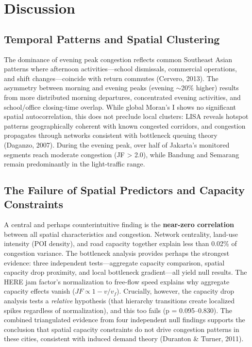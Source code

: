 \documentclass[12pt,a4paper]{article}
\begin{document}
\section{Discussion}

\subsection{Temporal Patterns and Spatial Clustering}

The dominance of evening peak congestion reflects common Southeast Asian patterns where afternoon activities---school dismissals, commercial operations, and shift changes---coincide with return commutes (Cervero, 2013). The asymmetry between morning and evening peaks (evening $\sim$20\% higher) results from more distributed morning departures, concentrated evening activities, and school/office closing-time overlap. While global Moran's I shows no significant spatial autocorrelation, this does not preclude local clusters: LISA reveals hotspot patterns geographically coherent with known congested corridors, and congestion propagates through networks consistent with bottleneck queuing theory (Daganzo, 2007). During the evening peak, over half of Jakarta's monitored segments reach moderate congestion (JF > 2.0), while Bandung and Semarang remain predominantly in the light-traffic range.

\subsection{The Failure of Spatial Predictors and Capacity Constraints}

A central and perhaps counterintuitive finding is the \textbf{near-zero correlation} between all spatial characteristics and congestion. Network centrality, land-use intensity (POI density), and road capacity together explain less than 0.02\% of congestion variance. The bottleneck analysis provides perhaps the strongest evidence: three independent tests---aggregate capacity comparison, spatial capacity drop proximity, and local bottleneck gradient---all yield null results. The HERE jam factor's normalization to free-flow speed explains why aggregate capacity effects vanish ($JF \propto 1 - v/v_f$). Crucially, however, the capacity drop analysis tests a \emph{relative} hypothesis (that hierarchy transitions create localized spikes regardless of normalization), and this too fails (p = 0.095--0.830). The combined triangulated evidence from four independent null findings supports the conclusion that spatial capacity constraints do not drive congestion patterns in these cities, consistent with induced demand theory (Duranton \& Turner, 2011).
\end{document}
